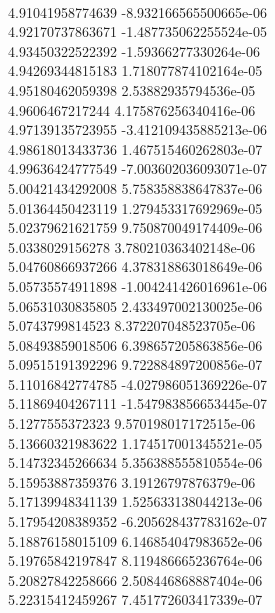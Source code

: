 { \\
4.91041958774639 -8.932166565500665e-06
 \\
4.92170737863671 -1.487735062255524e-05
 \\
4.93450322522392 -1.59366277330264e-06
 \\
4.94269344815183 1.718077874102164e-05
 \\
4.95180462059398 2.53882935794536e-05
 \\
4.9606467217244 4.175876256340416e-06
 \\
4.97139135723955 -3.412109435885213e-06
 \\
4.98618013433736 1.467515460262803e-07
 \\
4.99636424777549 -7.003602036093071e-07
 \\
5.00421434292008 5.758358838647837e-06
 \\
5.01364450423119 1.279453317692969e-05
 \\
5.02379621621759 9.750870049174409e-06
 \\
5.0338029156278 3.780210363402148e-06
 \\
5.04760866937266 4.378318863018649e-06
 \\
5.05735574911898 -1.004241426016961e-06
 \\
5.06531030835805 2.433497002130025e-06
 \\
5.0743799814523 8.372207048523705e-06
 \\
5.08493859018506 6.398657205863856e-06
 \\
5.09515191392296 9.722884897200856e-07
 \\
5.11016842774785 -4.027986051369226e-07
 \\
5.11869404267111 -1.547983856653445e-07
 \\
5.1277555372323 9.570198017172515e-06
 \\
5.13660321983622 1.174517001345521e-05
 \\
5.14732345266634 5.356388555810554e-06
 \\
5.15953887359376 3.19126797876379e-06
 \\
5.17139948341139 1.525633138044213e-06
 \\
5.17954208389352 -6.205628437783162e-07
 \\
5.18876158015109 6.146854047983652e-06
 \\
5.19765842197847 8.119486665236764e-06
 \\
5.20827842258666 2.508446868887404e-06
 \\
5.22315412459267 7.451772603417339e-07
 \\
}
